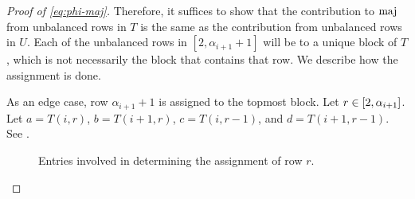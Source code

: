 \begin{proof}[Proof of \eqref{eq:phi-maj}]
    Therefore, it suffices to show that the contribution to \(\maj\) from unbalanced rows in \(T\) is the same as the contribution from unbalanced rows in \(U\).
    Each of the unbalanced rows in \([2, \alpha_{i+1} + 1]\) will be  to a unique block of \(T\), which is not necessarily the block that contains that row.
    We describe how the assignment is done.

    As an edge case, row \(\alpha_{i+1} + 1\) is assigned to the topmost block.
    Let \(r \in [2, \alpha_{i+1}]\).
    Let \(a = T(i, r)\), \(b = T(i+1, r)\), \(c = T(i, r-1)\), and \(d = T(i+1, r-1)\). See .

    \begin{figure}[htbp]
        \centering
        \vspace{-.5em}
        \caption{Entries involved in determining the assignment of row \(r\).}
        \label{fig:assignment-of-rows}
    \end{figure}
    

\end{proof}
